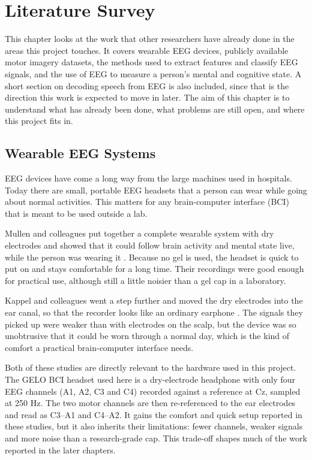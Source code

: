 \chapter{Literature Survey}

This chapter looks at the work that other researchers have already done in the areas this
project touches. It covers wearable EEG devices, publicly available motor imagery
datasets, the methods used to extract features and classify EEG signals, and the use of
EEG to measure a person's mental and cognitive state. A short section on decoding speech
from EEG is also included, since that is the direction this work is expected to move in
later. The aim of this chapter is to understand what has already been done, what problems
are still open, and where this project fits in.

\section{Wearable EEG Systems}

EEG devices have come a long way from the large machines used in hospitals. Today there
are small, portable EEG headsets that a person can wear while going about normal
activities. This matters for any brain-computer interface (BCI) that is meant to be used
outside a lab.

Mullen and colleagues put together a complete wearable system with dry electrodes and
showed that it could follow brain activity and mental state live, while the person was
wearing it \cite{mullen2015wearable}. Because no gel is used, the headset is quick to put
on and stays comfortable for a long time. Their recordings were good enough for practical
use, although still a little noisier than a gel cap in a laboratory.

Kappel and colleagues went a step further and moved the dry electrodes into the ear
canal, so that the recorder looks like an ordinary earphone \cite{kappel2019earEEG}. The
signals they picked up were weaker than with electrodes on the scalp, but the device was
so unobtrusive that it could be worn through a normal day, which is the kind of comfort a
practical brain-computer interface needs.

Both of these studies are directly relevant to the hardware used in this project. The GELO
BCI headset used here is a dry-electrode headphone with only four EEG channels (A1, A2, C3
and C4) recorded against a reference at Cz, sampled at 250 Hz. The two motor channels are
then re-referenced to the ear electrodes and read as C3--A1 and C4--A2. It gains the comfort and quick
setup reported in these studies, but it also inherits their limitations: fewer channels,
weaker signals and more noise than a research-grade cap. This trade-off shapes much of the
work reported in the later chapters.

